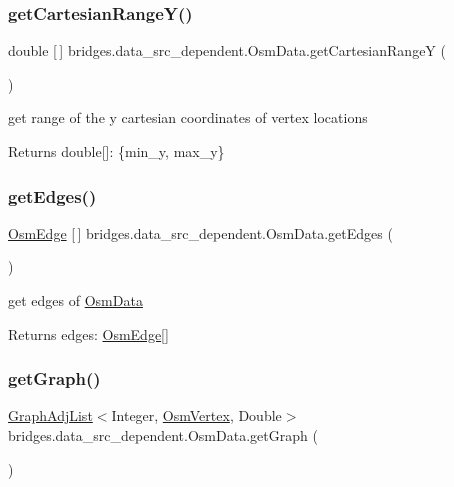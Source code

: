 \subsubsection{\texorpdfstring{getCartesianRangeY()}{getCartesianRangeY()}}
{\footnotesize\ttfamily double \mbox{[}$\,$\mbox{]} bridges.\+data\+\_\+src\+\_\+dependent.\+Osm\+Data.\+get\+Cartesian\+RangeY (\begin{DoxyParamCaption}{ }\end{DoxyParamCaption})}

get range of the y cartesian coordinates of vertex locations \begin{DoxyReturn}{Returns}
double\mbox{[}\mbox{]}\+: \{min\+\_\+y, max\+\_\+y\} 
\end{DoxyReturn}
\mbox{\label{classbridges_1_1data__src__dependent_1_1_osm_data_a1ceb1a4b7acd75ca655ad0769f6b427d}} 
\subsubsection{\texorpdfstring{getEdges()}{getEdges()}}
{\footnotesize\ttfamily \mbox{\hyperlink{classbridges_1_1data__src__dependent_1_1_osm_edge}{Osm\+Edge}} \mbox{[}$\,$\mbox{]} bridges.\+data\+\_\+src\+\_\+dependent.\+Osm\+Data.\+get\+Edges (\begin{DoxyParamCaption}{ }\end{DoxyParamCaption})}

get edges of \mbox{\hyperlink{classbridges_1_1data__src__dependent_1_1_osm_data}{Osm\+Data}} \begin{DoxyReturn}{Returns}
edges\+: \mbox{\hyperlink{classbridges_1_1data__src__dependent_1_1_osm_edge}{Osm\+Edge}}\mbox{[}\mbox{]} 
\end{DoxyReturn}
\mbox{\label{classbridges_1_1data__src__dependent_1_1_osm_data_a4f5282b7b11ef6e4a248a05c35fe3787}} 
\subsubsection{\texorpdfstring{getGraph()}{getGraph()}}
{\footnotesize\ttfamily \mbox{\hyperlink{classbridges_1_1base_1_1_graph_adj_list}{Graph\+Adj\+List}}$<$Integer, \mbox{\hyperlink{classbridges_1_1data__src__dependent_1_1_osm_vertex}{Osm\+Vertex}}, Double$>$ bridges.\+data\+\_\+src\+\_\+dependent.\+Osm\+Data.\+get\+Graph (\begin{DoxyParamCaption}{ }\end{DoxyParamCaption})}

